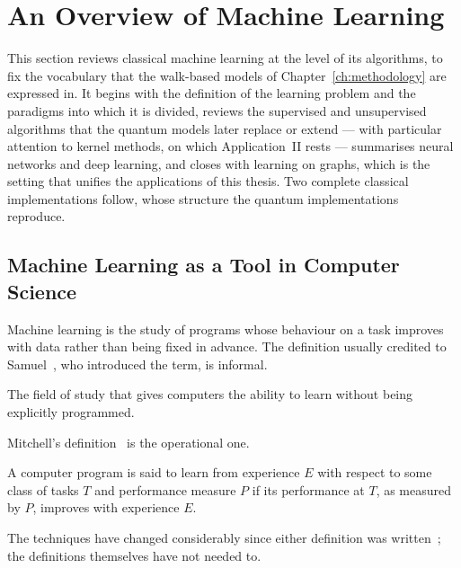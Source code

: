 \section{An Overview of Machine Learning}
\label{sec:prelim-ml}
This section reviews classical machine learning at the level of its
algorithms, to fix the vocabulary that the walk-based models of
Chapter~\ref{ch:methodology} are expressed in. It begins with the definition
of the learning problem and the paradigms into which it is divided, reviews
the supervised and unsupervised algorithms that the quantum models later
replace or extend --- with particular attention to kernel methods, on which
Application~II rests --- summarises neural networks and deep learning, and
closes with learning on graphs, which is the setting that unifies the
applications of this thesis. Two complete classical implementations follow,
whose structure the quantum implementations reproduce.

\subsection{Machine Learning as a Tool in Computer Science}
Machine learning is the study of programs whose behaviour on a task improves
with data rather than being fixed in advance. The definition usually credited
to Samuel~\cite{Samuel_1959}, who introduced the term, is informal.
\begin{definition}
The field of study that gives computers the ability to learn without being
explicitly programmed.
\end{definition}
Mitchell's definition~\cite{learning1997tom} is the operational one.
\begin{definition}
A computer program is said to learn from experience $E$ with respect to some
class of tasks $T$ and performance measure $P$ if its performance at $T$, as
measured by $P$, improves with experience $E$.
\end{definition}
The techniques have changed considerably since either definition was
written~\cite{alpaydin2021machine, ElNaqa2015}; the definitions themselves
have not needed to.

